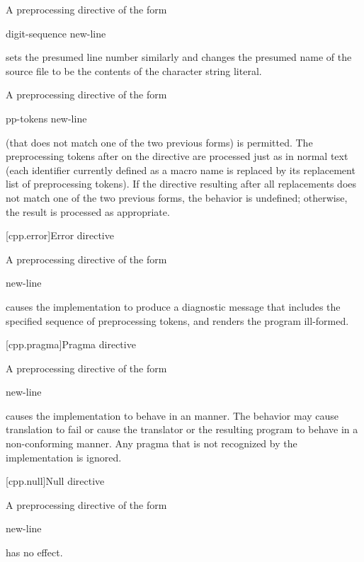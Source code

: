 \pnum
A preprocessing directive of the form
\begin{ncsimplebnf}
 digit-sequence    new-line
\end{ncsimplebnf}
sets the presumed line number similarly and changes the
presumed name of the source file to be the contents
of the character string literal.

\pnum
A preprocessing directive of the form
\begin{ncsimplebnf}
 pp-tokens new-line
\end{ncsimplebnf}
(that does not match one of the two previous forms)
is permitted.
The preprocessing tokens after
on the directive are processed just as in normal text
(each identifier currently defined as a macro name is replaced by its
replacement list of preprocessing tokens).
If the directive resulting after all replacements does not match
one of the two previous forms, the behavior is undefined;
otherwise, the result is processed as appropriate.

[cpp.error]{Error directive}%
%

\pnum
A preprocessing directive of the form
\begin{ncsimplebnf}
  new-line
\end{ncsimplebnf}
causes the implementation to produce
a diagnostic message that includes the specified sequence of preprocessing tokens,
and renders the program ill-formed.

[cpp.pragma]{Pragma directive}%
%

\pnum
A preprocessing directive of the form
\begin{ncsimplebnf}
  new-line
\end{ncsimplebnf}
causes the implementation to behave
in an  manner.
The behavior may cause translation to fail or cause the translator or
the resulting program to behave in a non-conforming manner.
Any pragma that is not recognized by the implementation is ignored.

[cpp.null]{Null directive}%

\pnum
A preprocessing directive of the form
\begin{ncsimplebnf}
\terminal{\#} new-line
\end{ncsimplebnf}
has no effect.

